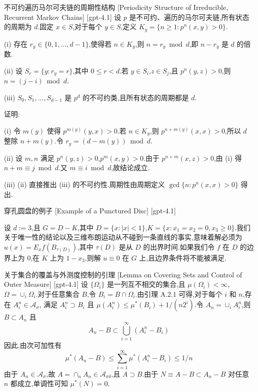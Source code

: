 \documentclass[UTF8]{ctexart}
\begin{document}
    \begin{lma}
        {不可约遍历马尔可夫链的周期性结构}
        [Periodicity Structure of Irreducible, Recurrent Markov Chains]
        [gpt-4.1]
        设 $p$ 是不可约、遍历的马尔可夫链,所有状态的周期为 $d$.固定 $x \in S$,对于每个 $y \in S$,定义 $K_{y} = \{ n \geq 1 : p^{n}(x, y) > 0 \}$.

(i) 存在 $r_{y} \in \{ 0, 1, \ldots, d - 1 \}$,使得若 $n \in K_{y}$,则 $n = r_{y} \bmod d$,即 $n - r_{y}$ 是 $d$ 的倍数.

(ii) 设 $S_{r} = \{ y : r_{y} = r \}$,其中 $0 \leq r < d$.若 $y \in S_{i}$,$z \in S_{j}$,且 $p^{n}(y, z) > 0$,则 $n = (j - i) \bmod d$.

(iii) $S_{0}, S_{1}, \ldots, S_{d-1}$ 是 $p^{d}$ 的不可约类,且所有状态的周期都是 $d$.

证明:

(i) 令 $m(y)$ 使得 $p^{m(y)}(y, x) > 0$.若 $n \in K_{y}$,则 $p^{n + m(y)}(x, x) > 0$,所以 $d$ 整除 $n + m(y)$.令 $r_{y} = (d - m(y)) \bmod d$.

(ii) 设 $m, n$ 满足 $p^{n}(y, z) > 0$,$p^{m}(x, y) > 0$.由于 $p^{n + m}(x, z) > 0$,由 (i) 得 $n + m \equiv j \bmod d$.又 $m \equiv i \bmod d$,故结论成立.

(iii) (ii) 直接推出 (iii) 的不可约性.周期性由周期定义 $\gcd\{ n : p^{n}(x, x) > 0 \}$ 得出.
    \end{lma}
    
    
    
    \begin{xmp}
        {穿孔圆盘的例子}
        [Example of a Punctured Disc]
        [gpt-4.1]
        
设 $d := 3$,且 $G = D - K$,其中 $D = \{ x : |x| < 1 \}$,$K = \{ x : x_1 = x_2 = 0, x_3 \geq 0 \}$.我们关于唯一性的结论以及三维布朗运动从不碰到一条直线的事实,意味着解必须为 $
u(x) = E_x f(B_{\tau(D)})$,其中 $\tau(D)$ 是从 $D$ 的出界时间.如果我们令 $f$ 在 $D$ 的边界上为 $0$,在 $K$ 上为 $1 - x_3$,则解 $
u \equiv 0$ 在 $G$ 上,且边界条件将不能被满足.

    \end{xmp}
    
    
    
    \begin{lma}
        {关于集合的覆盖与外测度控制的引理}
        [Lemma on Covering Sets and Control of Outer Measure]
        [gpt-4.1]
        设 $\{\Omega_i\}$ 是一列互不相交的集合,且 $\mu(\Omega_i) < \infty$,$\Omega = \cup_i \Omega_i$.对于任意集合 $B$,令 $B_i = B \cap \Omega_i$.由引理 A.2.1 可得,对于每个 $i$ 和 $n$,存在 $A_i^n \in \mathcal{A}_{\sigma}$, 满足 $A_i^n \supset B_i$ 且 $\mu(A_i^n) \leq \mu^*(B_i) + 1/(n 2^i)$.令 $A_n = \cup_i A_i^n$,则 $B \subset A_n$ 且
\[
A_n - B \subset \bigcup_{i=1}^{\infty}(A_i^n - B_i)
\]
因此,由次可加性有
\[
\mu^*(A_n - B) \leq \sum_{i=1}^{\infty} \mu^*(A_i^n - B_i) \leq 1/n
\]
由于 $A_n \in \mathcal{A}_{\sigma}$,故 $A = \cap_n A_n \in \mathcal{A}_{\sigma\delta}$,且 $A \supset B$.由于 $N \equiv A - B \subset A_n - B$ 对任意 $n$ 都成立,单调性可知 $\mu^*(N) = 0$.
    \end{lma}
    
\end{document}
